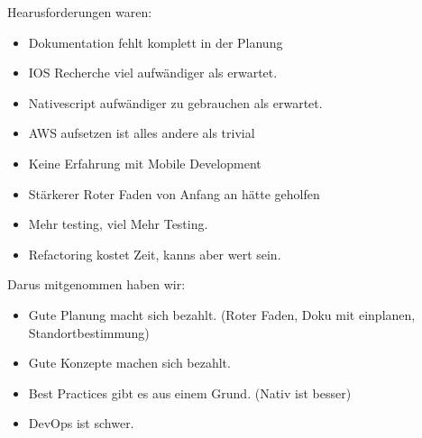 Hearusforderungen waren:
\begin{itemize}
    \item Dokumentation fehlt komplett in der Planung
    \item IOS Recherche viel aufwändiger als erwartet.
    \item Nativescript aufwändiger zu gebrauchen als erwartet.
    \item AWS aufsetzen ist alles andere als trivial
    \item Keine Erfahrung mit Mobile Development
    \item Stärkerer Roter Faden von Anfang an hätte geholfen
    \item Mehr testing, viel Mehr Testing.
    \item Refactoring kostet Zeit, kanns aber wert sein.
\end{itemize}

Darus mitgenommen haben wir:
\begin{itemize}
    \item Gute Planung macht sich bezahlt. (Roter Faden, Doku mit einplanen, Standortbestimmung)
    \item Gute Konzepte machen sich bezahlt.
    \item Best Practices gibt es aus einem Grund. (Nativ ist besser)
    \item DevOps ist schwer.
\end{itemize}





